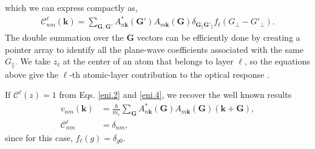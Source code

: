 which we can express compactly as,
\begin{align}\label{eni.4}
\mathcal{C}^{\ell}_{nm}(\mathbf{k})=
\sum_{\mathbf{G},\mathbf{G}'} A^*_{n\mathbf{k}}(\mathbf{G}')  A_{m\mathbf{k}}(\mathbf{G})
\delta_{\mathbf{G}_\parallel \mathbf{G}'_\parallel} 
f_{\ell}(G_\perp-G'_\perp)
.
\end{align}  
The double summation over the $\mathbf{G}$ vectors can be efficiently done by
creating a pointer array to identify all the plane-wave coefficients associated
with the same $G_{\parallel}$. We take $z_{\ell}$ at the center of an atom that
belongs to layer $\ell$, so the equations above give the $\ell$-th atomic-layer
contribution to the optical response \cite{mendozaPRB06}.

If $\mathcal{C}^{\ell}(z) = 1$ from Eqs. \eqref{eni.2} and \eqref{eni.4}, we
recover the well known results
\begin{align}\label{eni.21}
v_{nm}(\mathbf{k})
&= \frac{\hbar}{m_{e}}\sum_{\mathbf{G}}
A^*_{n\mathbf{k}}(\mathbf{G})A_{m\mathbf{k}}(\mathbf{G})(\mathbf{k}+\mathbf{G}),
\nonumber\\
\mathcal{C}^{\ell}_{nm} &= \delta_{nm},
\end{align}  
since for this case, $f_{\ell}(g) = \delta_{g0}$.





